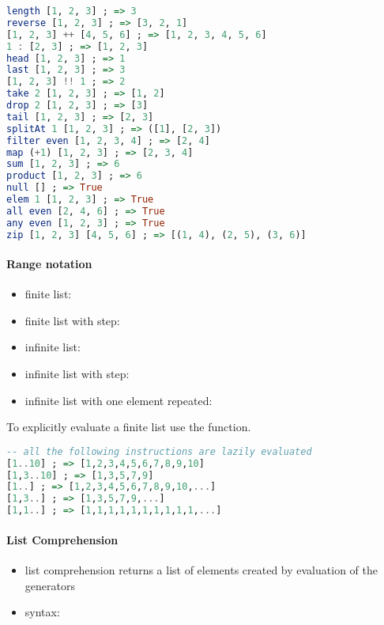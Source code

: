\documentclass[a4paper,landscape,10pt]{article}
\begin{document}
\begin{multicols*}{2}
  \begin{lstlisting}[language=Haskell]
length [1, 2, 3] ; => 3
reverse [1, 2, 3] ; => [3, 2, 1]
[1, 2, 3] ++ [4, 5, 6] ; => [1, 2, 3, 4, 5, 6]
1 : [2, 3] ; => [1, 2, 3]
head [1, 2, 3] ; => 1
last [1, 2, 3] ; => 3
[1, 2, 3] !! 1 ; => 2
take 2 [1, 2, 3] ; => [1, 2]
drop 2 [1, 2, 3] ; => [3]
tail [1, 2, 3] ; => [2, 3]
splitAt 1 [1, 2, 3] ; => ([1], [2, 3])
filter even [1, 2, 3, 4] ; => [2, 4]
map (+1) [1, 2, 3] ; => [2, 3, 4]
sum [1, 2, 3] ; => 6
product [1, 2, 3] ; => 6
null [] ; => True
elem 1 [1, 2, 3] ; => True
all even [2, 4, 6] ; => True
any even [1, 2, 3] ; => True
zip [1, 2, 3] [4, 5, 6] ; => [(1, 4), (2, 5), (3, 6)]
\end{lstlisting}

  \paragraph{Range notation}

  \begin{itemize}
    \item finite list: 
    \item finite list with step: 
    \item infinite list: \ihaskell{[<start>..]}
    \item infinite list with step: 
    \item infinite list with one element repeated: 
  \end{itemize}

  To explicitly evaluate a finite list use the  function.

  \begin{lstlisting}[language=Haskell]
-- all the following instructions are lazily evaluated
[1..10] ; => [1,2,3,4,5,6,7,8,9,10]
[1,3..10] ; => [1,3,5,7,9]
[1..] ; => [1,2,3,4,5,6,7,8,9,10,...]
[1,3..] ; => [1,3,5,7,9,...]
[1,1..] ; => [1,1,1,1,1,1,1,1,1,1,...]
\end{lstlisting}

  \paragraph{List Comprehension}

  \begin{itemize}
    \item list comprehension returns a list of elements created by evaluation of the generators
    \item syntax: 
  \end{itemize}


\end{multicols*}
\end{document}
